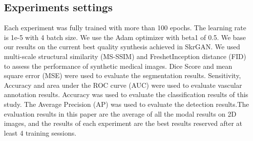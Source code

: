 \documentclass[runningheads]{llncs}
\begin{document}
	\subsection{Experiments settings}
	Each experiment was fully trained with more than 100 epochs. The learning rate is 1e-5 with 4 batch size. We use the Adam optimizer with beta1 of 0.5.
	We base our results on the current best quality synthesis achieved in SkrGAN\cite{96zhang2019skrgan:}. We used multi-scale structural similarity (MS-SSIM) and FreshetInception distance (FID)\cite{148karras2017progressive} to assess the performance of synthetic medical images. Dice Score\cite {95dice1945measures} and mean square error (MSE) were used to evaluate the segmentation results. Sensitivity, Accuracy and area under the ROC curve (AUC) were used to evaluate vascular annotation results. Accuracy was used to evaluate the classification results of this study. The Average Precision (AP) was used to evaluate the detection results.The evaluation results in this paper are the average of all the modal results on 2D images, and the results of each experiment are the best results reserved after at least 4 training sessions.
	
\end{document}
